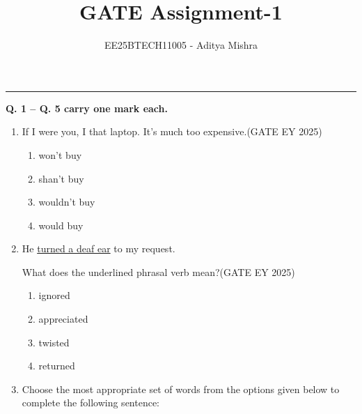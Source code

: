 



\title{GATE Assignment-1}
\author{EE25BTECH11005 - Aditya Mishra}
\maketitle
{\let\newpage\relax\maketitle}
\rule{\columnwidth}{0.3pt}

\textbf{Q. 1 -- Q. 5 carry one mark each.}

\begin{enumerate}
\item If I were you, I \underline{\hspace{2.5cm}} that laptop. It’s much too expensive.\hfill {(GATE EY 2025)}

\begin{multicols}{2}
\begin{enumerate}
\item won’t buy
\item shan’t buy
\item wouldn’t buy
\item would buy
\end{enumerate}
\end{multicols}



\item He \underline{turned a deaf ear} to my request. 

What does the underlined phrasal verb mean?\hfill {(GATE EY 2025)}

\begin{multicols}{2}
\begin{enumerate}
\item ignored
\item appreciated
\item twisted
\item returned
\end{enumerate}
\end{multicols}


\item Choose the most appropriate set of words from the options given below to complete the following sentence:


\end{enumerate}
